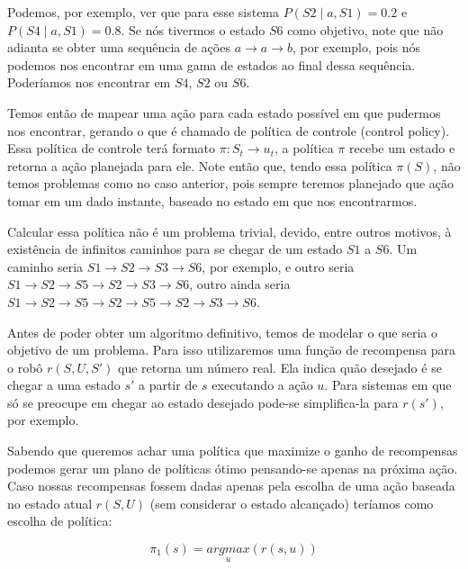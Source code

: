 Podemos, por exemplo, ver que para esse sistema $ P \left( S2 \mid a, S1 \right) = 0.2 $ e $ P \left( S4 \mid a, S1 \right) = 0.8 $. Se nós tivermos o estado $ S6 $ como objetivo, note que não adianta se obter uma sequência de ações $ a \rightarrow a \rightarrow b$, por exemplo, pois nós podemos nos encontrar em uma gama de estados ao final dessa sequência. Poderíamos nos encontrar em $ S4 $, $ S2 $ ou $ S6 $.

Temos então de mapear uma ação para cada estado possível em que pudermos nos encontrar, gerando o que é chamado de política de controle (control policy). Essa política de controle terá formato $ \pi: S_t \rightarrow u_t $, a política $ \pi $ recebe um estado e retorna a ação planejada para ele. Note então que, tendo essa política $ \pi \left( S \right) $, não temos problemas como no caso anterior, pois sempre teremos planejado que ação tomar em um dado instante, baseado no estado em que nos encontrarmos.

Calcular essa política não é um problema trivial, devido, entre outros motivos, à existência de infinitos caminhos para se chegar de um estado $ S1 $ a $ S6 $. Um caminho seria $ S1 \rightarrow S2 \rightarrow S3 \rightarrow S6 $, por exemplo, e outro seria $ S1 \rightarrow S2 \rightarrow S5 \rightarrow S2 \rightarrow S3 \rightarrow S6 $, outro ainda seria $ S1 \rightarrow S2 \rightarrow S5 \rightarrow S2 \rightarrow S5 \rightarrow S2 \rightarrow S3 \rightarrow S6 $.

Antes de poder obter um algoritmo definitivo, temos de modelar o que seria o objetivo de um problema. Para isso utilizaremos uma função de recompensa para o robô $ r \left( S, U, S' \right) $ que retorna um número real. Ela indica quão desejado é se chegar a uma estado $ s' $ a partir de $ s $ executando a ação $ u $. Para sistemas em que só se preocupe em chegar ao estado desejado pode-se simplifica-la para $ r \left( s' \right) $, por exemplo.

Sabendo que queremos achar uma política que maximize o ganho de recompensas podemos gerar um plano de políticas ótimo pensando-se apenas na próxima ação. Caso nossas recompensas fossem dadas apenas pela escolha de uma ação baseada no estado atual $ r \left( S, U \right) $ (sem considerar o estado alcançado) teríamos como escolha de política:

\begin{equation}
    \pi_1 \left( s \right) = \underset{u}{argmax} \left( r \left( s, u \right) \right)
\end{equation}

